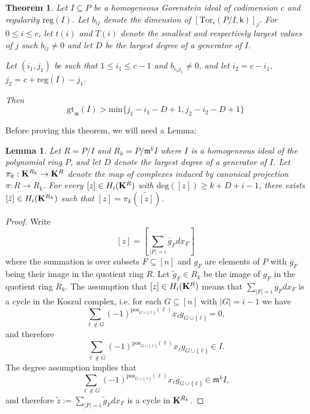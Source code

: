 \documentclass[10pt,reqno]{amsart}
\newtheorem{theorem}[subsection]{Theorem}
\newtheorem{lemma}[subsection]{Lemma}
\theoremstyle{definition}
\theoremstyle{remark}
\numberwithin{equation}{section}
\newcommand{\kk}{\mathsf k}
\newcommand{\m}{\mathfrak m}
\numberwithin{equation}{section}
\begin{document}
\begin{theorem}\label{lower bound for gorenstein}
Let $I\subseteq P$ be a homogeneous Gorenstein ideal of codimension $c$ and regularity $\mathrm{reg}(I)$. Let $b_{ij}$ denote the dimension of $[\mathrm{Tor}_i(P/I, \kk)]_j$. For $0\le i\le c$, let $t(i)$ and $T(i)$ denote the smallest and respectively largest values of $j$ such 
$b_{ij}\ne 0$ and let $D$ be the largest degree of a generator of $I$.

Let $(i_1, j_1)$ be such that $1\le i_1\le c-1$ and $b_{i_1 j_1}\ne 0$, and let $i_2=c-i_1$, $j_2=c+\mathrm{reg}(I)-j_1$.

Then 
$$
\mathrm{gt}_{\m}(I)> \mathrm{min}\{j_1-i_1-D+1, j_2-i_2-D+1\}
$$\end{theorem}
Before proving this theorem, we will need a Lemma:
\begin{lemma}\label{mod k}
Let $R=P/I$ and $R_k=P/\m^kI$ where $I$ is a homogeneous ideal of the polynomial ring $P$, and let $D$ denote the largest degree of a generator of $I$. Let $\pi_k: {\bf K}^{R_k}\to {\bf K}^R$ denote the map of complexes induced by  canonical projection $\pi: R\to R_k$.
For every $[z]\in H_i({\bf K}^{R})$ with
$\mathrm{deg}([z])\ge k+D+i-1$, there exists $[\tilde{z}]\in H_i({\bf K}^{R_k})$ such that $[z]=\pi_k(\tilde{[z]})$. 
\end{lemma}
\begin{proof}
Write $$[z]=[\sum_{|F|=i} \overline{g}_Fdx_F]$$
where the summation is over subsets $F\subseteq [n]$ and $g_F$ are elements of $P$ with $\overline{g}_F$ being their image in the quotient ring $R$. Let $\tilde{g}_F\in R_k$ be the image of $ g_F$ in the quotient ring $R_k$.
The assumption that $[z]\in H_i({\bf K}^R)$ means that $\sum_{|F|=i} \overline{g}_Fdx_F$ is a cycle in the Koszul complex, i.e. for each $G\subseteq [n]$ with $|G|=i-1$ we have 
$$
\sum_{\ell \notin G} (-1)^{\mathrm{pos}_{G\cup\{\ell\}}(\ell) }\overline{x_{\ell } g_{G\cup \{\ell\}}}=0,$$ 
and therefore 
$$
\sum_{\ell \notin G} (-1)^{\mathrm{pos}_{G\cup\{\ell\}}(\ell) }x_{\ell } g_{G\cup \{\ell\}}\in I.$$
The degree assumption implies that 
$$
\sum_{\ell \notin G} (-1)^{\mathrm{pos}_{G\cup\{\ell\}}(\ell)} x_{\ell } g_{G\cup \{\ell\}}\in \m^k I,$$
and therefore 
$\tilde{z}:=\sum_{|F|=i} \tilde{g}_F dx_F$ is a cycle in ${\bf K}^{R_k}$.
\end{proof}
\end{document}
